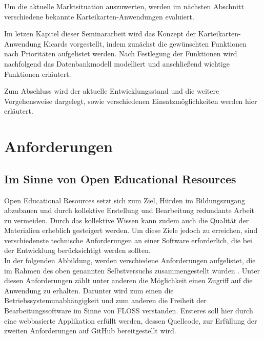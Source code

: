 Um die aktuelle Marktsituation auszuwerten, werden im nächsten Abschnitt verschiedene bekannte Karteikarten-Anwendungen evaluiert. 

Im letzen Kapitel dieser Seminararbeit wird das Konzept der Karteikarten-Anwendung Kicards vorgestellt, indem zunächst die gewünschten Funktionen nach Prioritäten aufgelistet werden. Nach Festlegung der Funktionen wird nachfolgend das Datenbankmodell modelliert und anschließend wichtige Funktionen erläutert. 

Zum Abschluss wird der aktuelle Entwicklungsstand und die weitere Vorgehensweise dargelegt, sowie verschiedenen Einsatzmöglichkeiten werden hier erläutert.


\section{Anforderungen}


\subsection{Im Sinne von Open Educational Resources}
Open Educational Resources setzt sich zum Ziel, Hürden im Bildungszugang abzubauen und durch kollektive Erstellung und Bearbeitung redundante Arbeit zu vermeiden. Durch das kollektive Wissen kann zudem auch die Qualität der Materialien erheblich gesteigert werden. Um diese Ziele jedoch zu erreichen, sind verschiedenste technische Anforderungen an einer Software erforderlich, die bei der Entwicklung berücksichtigt werden sollten. \\

In der folgenden Abbildung, werden verschiedene Anforderungen aufgelistet, die im Rahmen des oben genannten Selbstversuchs zusammengestellt wurden \cite{Lechtenborger.2019}. Unter diesen Anforderungen zählt unter anderen die Möglichkeit einen Zugriff auf die Anwendung zu erhalten. Darunter wird zum einen die Betriebssystemunabhängigkeit und zum anderen die Freiheit der Bearbeitungssoftware im Sinne von FLOSS verstanden. Ersteres soll hier durch eine webbasierte Applikation erfüllt werden, dessen Quellcode, zur Erfüllung der zweiten Anforderungen auf GitHub bereitgestellt wird. 

